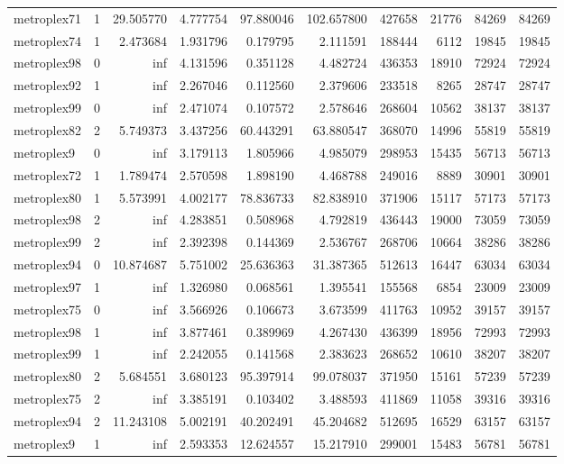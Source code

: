 \begin{longtable}{|l|r|r|r|r|r|r|r|r|r|}
metroplex71 & 1 & 29.505770 & 4.777754 & 97.880046 & 102.657800 & 427658 & 21776 & 84269 & 84269 \\
metroplex74 & 1 & 2.473684 & 1.931796 & 0.179795 & 2.111591 & 188444 & 6112 & 19845 & 19845 \\
metroplex98 & 0 & inf & 4.131596 & 0.351128 & 4.482724 & 436353 & 18910 & 72924 & 72924 \\
metroplex92 & 1 & inf & 2.267046 & 0.112560 & 2.379606 & 233518 & 8265 & 28747 & 28747 \\
metroplex99 & 0 & inf & 2.471074 & 0.107572 & 2.578646 & 268604 & 10562 & 38137 & 38137 \\
metroplex82 & 2 & 5.749373 & 3.437256 & 60.443291 & 63.880547 & 368070 & 14996 & 55819 & 55819 \\
metroplex9 & 0 & inf & 3.179113 & 1.805966 & 4.985079 & 298953 & 15435 & 56713 & 56713 \\
metroplex72 & 1 & 1.789474 & 2.570598 & 1.898190 & 4.468788 & 249016 & 8889 & 30901 & 30901 \\
metroplex80 & 1 & 5.573991 & 4.002177 & 78.836733 & 82.838910 & 371906 & 15117 & 57173 & 57173 \\
metroplex98 & 2 & inf & 4.283851 & 0.508968 & 4.792819 & 436443 & 19000 & 73059 & 73059 \\
metroplex99 & 2 & inf & 2.392398 & 0.144369 & 2.536767 & 268706 & 10664 & 38286 & 38286 \\
metroplex94 & 0 & 10.874687 & 5.751002 & 25.636363 & 31.387365 & 512613 & 16447 & 63034 & 63034 \\
metroplex97 & 1 & inf & 1.326980 & 0.068561 & 1.395541 & 155568 & 6854 & 23009 & 23009 \\
metroplex75 & 0 & inf & 3.566926 & 0.106673 & 3.673599 & 411763 & 10952 & 39157 & 39157 \\
metroplex98 & 1 & inf & 3.877461 & 0.389969 & 4.267430 & 436399 & 18956 & 72993 & 72993 \\
metroplex99 & 1 & inf & 2.242055 & 0.141568 & 2.383623 & 268652 & 10610 & 38207 & 38207 \\
metroplex80 & 2 & 5.684551 & 3.680123 & 95.397914 & 99.078037 & 371950 & 15161 & 57239 & 57239 \\
metroplex75 & 2 & inf & 3.385191 & 0.103402 & 3.488593 & 411869 & 11058 & 39316 & 39316 \\
metroplex94 & 2 & 11.243108 & 5.002191 & 40.202491 & 45.204682 & 512695 & 16529 & 63157 & 63157 \\
metroplex9 & 1 & inf & 2.593353 & 12.624557 & 15.217910 & 299001 & 15483 & 56781 & 56781 \\

\end{longtable}
